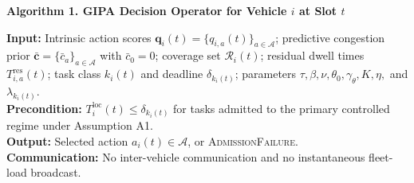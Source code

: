 \documentclass[10pt]{article}
\begin{document}
\begin{center}
{\large\bfseries Algorithm 1. GIPA Decision Operator for Vehicle $i$ at Slot $t$}
\end{center}
\vspace{-3pt}

{\small
\textbf{Input:}
Intrinsic action scores
$\mathbf q_i(t)=\{q_{i,a}(t)\}_{a\in\mathcal A}$;
predictive congestion prior
$\bar{\mathbf c}=\{\bar c_a\}_{a\in\mathcal A}$ with $\bar c_0=0$;
coverage set $\mathcal R_i(t)$;
residual dwell times $T_{i,a}^{\mathrm{res}}(t)$;
task class $k_i(t)$ and deadline $\delta_{k_i(t)}$;
parameters $\tau,\beta,\nu,\theta_0,\gamma_\theta,K,\eta,$ and $\lambda_{k_i(t)}$.\\
\textbf{Precondition:}
$T_i^{\mathrm{loc}}(t)\leq\delta_{k_i(t)}$
for tasks admitted to the primary controlled regime under Assumption A1.\\
\textbf{Output:}
Selected action $a_i(t)\in\mathcal A$, or \textsc{AdmissionFailure}.\\
\textbf{Communication:}
No inter-vehicle communication and no instantaneous fleet-load broadcast.
}
\end{document}
